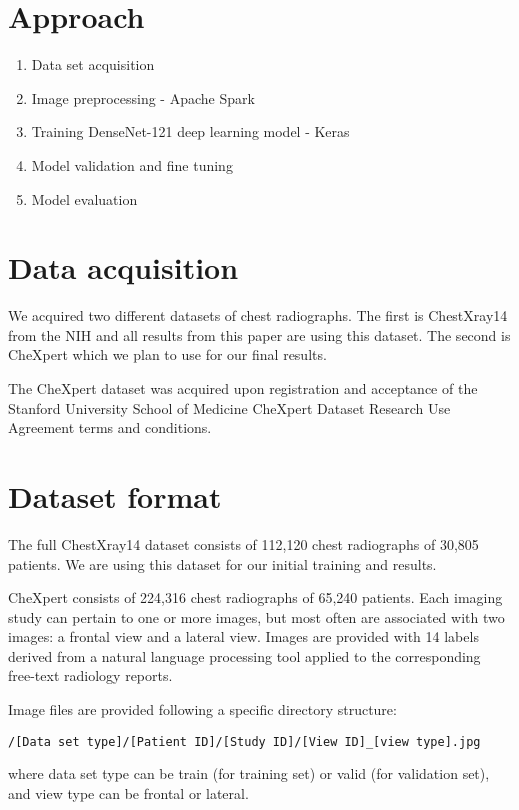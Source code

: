 \documentclass{amia}
\begin{document}
\section*{Approach}
\begin{enumerate}
\item Data set acquisition
\item Image preprocessing - Apache Spark
\item Training DenseNet-121 deep learning model - Keras
\item Model validation and fine tuning
\item Model evaluation
\end{enumerate}

\section*{Data acquisition}
We acquired two different datasets of chest radiographs. The first is ChestXray14 from the NIH and all results from this paper are using this dataset. The second is CheXpert which we plan to use for our final results.

The CheXpert dataset was acquired upon registration and acceptance of the Stanford University School of Medicine CheXpert Dataset Research Use Agreement terms and conditions.\cite{ref2}

\section*{Dataset format}
The full ChestXray14 dataset consists of 112,120 chest radiographs of 30,805 patients. We are using this dataset for our initial training and results.

CheXpert consists of 224,316 chest radiographs of 65,240 patients. Each imaging study can pertain to one or more images, but most often are associated with two images: a frontal view and a lateral view. Images are provided with 14 labels derived from a natural language processing tool applied to the corresponding free-text radiology reports.

Image files are provided following a specific directory structure:

\newcommand{\code}[1]{\colorbox{light-gray}{\texttt{#1}}}

\code{/[Data set type]/[Patient ID]/[Study ID]/[View ID]\_[view type].jpg}

where data set type can be train (for training set) or valid (for validation set), and view type can be frontal or lateral.
\end{document}
